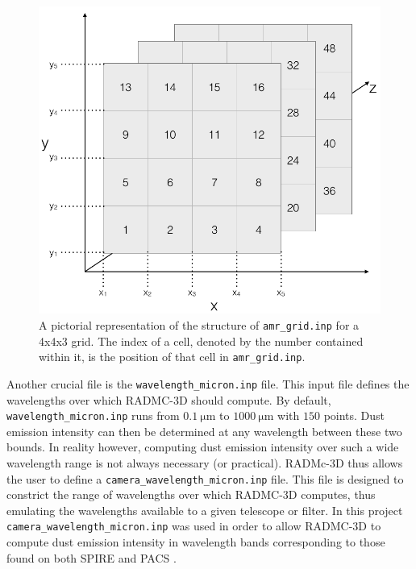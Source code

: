 \documentclass{report}
\begin{document}
\begin{figure}
  \centering
  \includegraphics[scale=0.3]{../img/amr_grid_structure}
  \caption[A pictorial representation of the structure of \texttt{amr\_grid.inp} for a 4x4x3 grid. The index of a cell, denoted by the number contained within it, is the position of that cell in \texttt{amr\_grid.inp}.]{A pictorial representation of the structure of \texttt{amr\_grid.inp} for a 4x4x3 grid. The index of a cell, denoted by the number contained within it, is the position of that cell in \texttt{amr\_grid.inp}.}
\end{figure}\label{fig:amr_grid_structure}

Another crucial file is the \texttt{wavelength\_micron.inp} file. This input file defines the wavelengths over which RADMC-3D should compute. By default, \texttt{wavelength\_micron.inp} runs from $\SI{0.1}{\micro\meter}$ to $\SI{1000}{\micro\meter}$ with $150$ points. Dust emission intensity can then be determined at any wavelength between these two bounds. In reality however, computing dust emission intensity over such a wide wavelength range is not always necessary (or practical). RADMc-3D thus allows the user to define a \texttt{camera\_wavelength\_micron.inp} file. This file is designed to constrict the range of wavelengths over which RADMC-3D computes, thus emulating the wavelengths available to a given telescope or filter. In this project \texttt{camera\_wavelength\_micron.inp} was used in order to allow RADMC-3D to compute dust emission intensity in wavelength bands corresponding to those found on both SPIRE \parencite{SPIRE} and PACS \parencite{PACS}.
\end{document}
